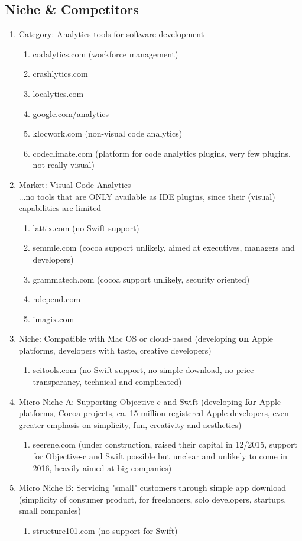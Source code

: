 \documentclass{article}
\begin{document}
\subsection{Niche \& Competitors}
\begin{enumerate}
	\item Category: Analytics tools for software development
	\begin{enumerate}
		\item codalytics.com (workforce management)
		\item crashlytics.com
		\item localytics.com
		\item google.com/analytics
		\item klocwork.com (non-visual code analytics)
		\item codeclimate.com (platform for code analytics plugins, very few plugins, not really visual)
	\end{enumerate}
	\item Market: Visual Code Analytics\\...no tools that are ONLY available as IDE plugins, since their (visual) capabilities are limited
	\begin{enumerate}
		\item lattix.com (no Swift support)
		\item semmle.com (cocoa support unlikely, aimed at executives, managers and developers)
		\item grammatech.com (cocoa support unlikely, security oriented)
		\item ndepend.com
		\item imagix.com
	\end{enumerate}
	\item Niche: Compatible with Mac OS or cloud-based (developing \textbf{on} Apple platforms, developers with taste, creative developers)
	\begin{enumerate}
		\item scitools.com (no Swift support, no simple download, no price transparancy, technical and complicated)
	\end{enumerate}
	\item Micro Niche A: Supporting Objective-c and Swift (developing \textbf{for} Apple platforms, Cocoa projects, ca. 15 million registered Apple developers, even greater emphasis on simplicity, fun, creativity and aesthetics)
	\begin{enumerate}
		\item seerene.com (under construction, raised their capital in 12/2015, support for Objective-c and Swift possible but unclear and unlikely to come in 2016, heavily aimed at big companies)
	\end{enumerate}
	\item Micro Niche B: Servicing "small" customers through simple app download (simplicity of consumer product, for freelancers, solo developers, startups, small companies)
	\begin{enumerate}
		\item structure101.com (no support for Swift)
	\end{enumerate}
\end{enumerate}
\end{document}
